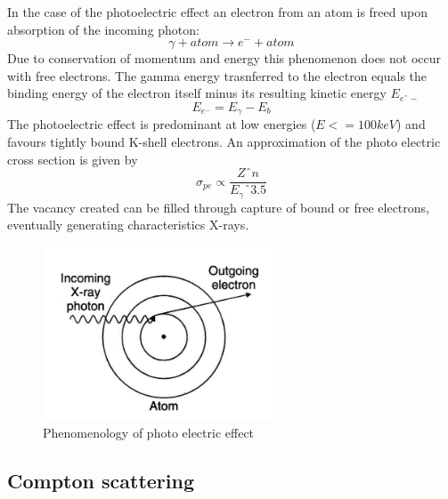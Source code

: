In the case of the photoelectric effect an electron from an atom is freed upon absorption of the incoming photon:
\begin{equation}
\gamma + atom \rightarrow e^{-} + atom
\end{equation}
Due to conservation of momentum and energy this phenomenon does not occur with free electrons. 
The gamma energy trasnferred to the electron equals the binding energy of the electron itself minus its resulting kinetic energy $E_{eˆ{-}}$ 
\begin{equation}
E_{e^{-}} = E_{\gamma} - E_{b}
\end{equation}
The photoelectric effect is predominant at low energies ($E<= 100 keV$) and favours tightly bound K-shell electrons. An approximation of the photo electric cross section is given by
\begin{equation}
\sigma _{pe} \propto \frac{Zˆ{n}}{E_{\gamma}ˆ{3.5}}
\end{equation}
The vacancy created can be filled through capture of bound or free electrons, eventually generating characteristics X-rays.  

\begin{figure}
\centering
\includegraphics[width=7cm]{../Pictures/Chapter_2/photo_el_2}
\caption[Photo electric effect]{Phenomenology of photo electric effect}
\label{fig:photo_electric}
\end{figure}
\newpage
\subsection{Compton scattering}

